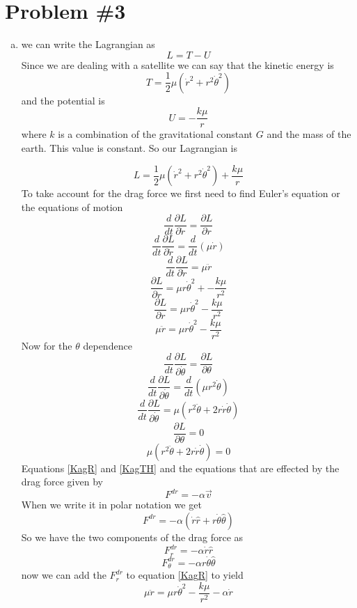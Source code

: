 \documentclass[11pt]{article}
\numberwithin{equation}{section}
\begin{document}
\section{Problem \#3}
\begin{enumerate}[(a)]
\item
we can write the Lagrangian as
$$L = T-U$$
Since we are dealing with a satellite we can say that the kinetic energy is
$$T = \frac{1}{2}\mu(\dot{r}^2 + r^2\dot{\theta}^2)$$
and the potential is
$$U= -\frac{k\mu}{r}$$
where $k$ is a combination of the gravitational constant $G$ and the mass of the earth. This value is constant. So our Lagrangian is

$$L = \frac{1}{2}\mu(\dot{r}^2 + r^2\dot{\theta}^2) + \frac{k\mu}{r}$$
To take account for the drag force we first need to find Euler's equation or the equations of motion
$$\frac{d}{dt}\frac{\partial L}{\partial \dot{r}} = \frac{\partial L}{\partial r}$$
$$\frac{d}{dt}\frac{\partial L}{\partial \dot{r}} = \frac{d}{dt}(\mu\dot{r})$$
$$\frac{d}{dt}\frac{\partial L}{\partial \dot{r}} = \mu\ddot{r}$$
$$\frac{\partial L}{\partial r} = \mu r\dot{\theta}^2 + -\frac{k\mu}{r^2}$$
$$\frac{\partial L}{\partial r} = \mu r\dot{\theta}^2  - \frac{k\mu}{r^2}$$
\begin{equation}
\mu\ddot{r}= \mu r\dot{\theta}^2 - \frac{k\mu}{r^2}
\label{KagR}
\end{equation}
Now for the $\theta$ dependence
$$\frac{d}{dt}\frac{\partial L}{\partial \dot{\theta}} = \frac{\partial L}{\partial \theta}$$
$$\frac{d}{dt}\frac{\partial L}{\partial \dot{\theta}} = \frac{d}{dt}(\mu r^2 \dot{\theta})$$
$$\frac{d}{dt}\frac{\partial L}{\partial \dot{\theta}} = \mu (r^2 \ddot{\theta}+2r\dot{r}\dot{\theta})$$
$$\frac{\partial L}{\partial \theta} = 0$$
\begin{equation}
\mu (r^2 \ddot{\theta}+2r\dot{r}\dot{\theta})=0
\label{KagTH}
\end{equation}
Equations \ref{KagR} and \ref{KagTH} and the equations that are effected by the drag force given by
$$F^{dr} = -\alpha \vec{v}$$
When we write it in polar notation we get
$$F^{dr} = -\alpha (\dot{r}\hat{r} + r\dot{\theta}\hat{\theta})$$
So we have the two components of the drag force as
$$F^{dr}_r = -\alpha\dot{r}\hat{r}$$
$$F^{dr}_{\theta} = -\alpha r\dot{\theta}\hat{\theta}$$
now we can add the  $F^{dr}_r$ to equation \ref{KagR} to yield
$$\mu\ddot{r}= \mu r\dot{\theta}^2 - \frac{k\mu}{r^2} - \alpha\dot{r}$$


\end{enumerate}
\end{document}
